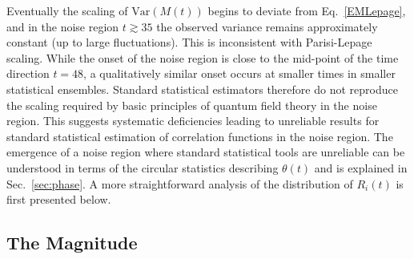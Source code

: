 Eventually the scaling of $\text{Var}(M(t))$ begins to deviate from Eq.~\eqref{EMLepage}, 
and in the noise region $t\gtrsim 35$ the observed variance remains approximately  constant (up to large fluctuations). 
This is inconsistent with Parisi-Lepage scaling. While the onset of the noise region is close to the mid-point of the time direction $t=48$, a qualitatively similar onset occurs at smaller times in smaller statistical ensembles.
Standard statistical estimators therefore do not reproduce the scaling required by basic principles of quantum field theory 
in the noise region. 
This suggests systematic deficiencies leading to unreliable results for standard statistical estimation of correlation 
functions in the noise region. 
The emergence of a noise region where standard statistical tools are unreliable can be understood in terms of the 
circular statistics describing $\theta(t)$ and is explained in Sec.~\ref{sec:phase}. 
A more straightforward analysis of the distribution of $R_i(t)$ is first presented below.






\subsection{The Magnitude}
\label{sec:magnitude}

